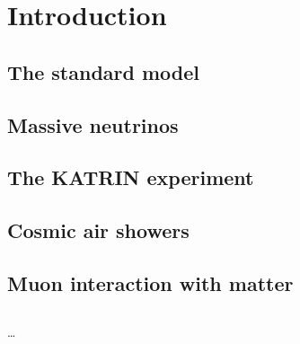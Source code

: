 
\chapter{Introduction}
\label{ch:Introduction}
    \section{The standard model}
    \label{ch:Introduction:sec:The standard model}

    \section{Massive neutrinos}
    \label{ch:Introduction:sec:Massive neutrino}

    \section{The KATRIN experiment}
    \label{ch:Introduction:sec:Massive neutrino}

    \section{Cosmic air showers}
    \label{ch:Introduction:sec:Cosmic air showers}

    \section{Muon interaction with matter}
    \label{ch:Introduction:sec:Muon interaction with matter}

    \section{}

\cite{becker2008a}
\dots

